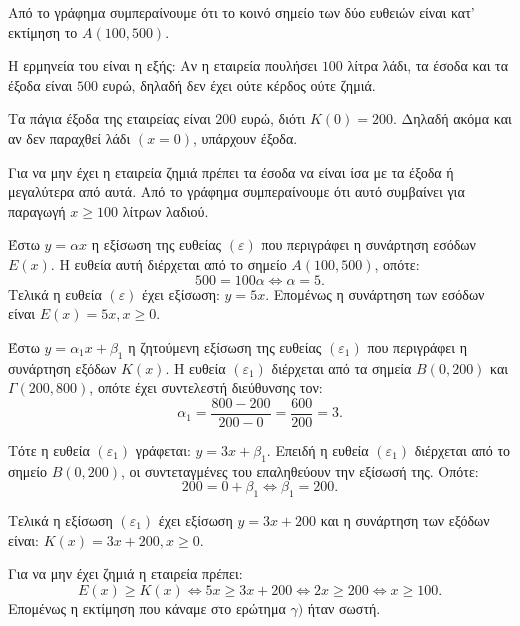 
\begin{alist}
\item Από το γράφημα συμπεραίνουμε ότι το κοινό σημείο των δύο ευθειών είναι κατ' εκτίμηση το $A(100, 500)$.

Η ερμηνεία του είναι η εξής:
Αν η εταιρεία πουλήσει $100$ λίτρα λάδι, τα έσοδα και τα έξοδα είναι $500$ ευρώ, δηλαδή δεν έχει ούτε κέρδος ούτε ζημιά.

\item Τα πάγια έξοδα της εταιρείας είναι $200$ ευρώ, διότι $K(0) = 200$. Δηλαδή ακόμα και αν δεν παραχθεί λάδι $(x = 0)$, υπάρχουν έξοδα.

\item Για να μην έχει η εταιρεία ζημιά πρέπει τα έσοδα να είναι ίσα με τα έξοδα ή μεγαλύτερα από αυτά. Από το γράφημα συμπεραίνουμε ότι αυτό συμβαίνει για παραγωγή $x \ge 100$ λίτρων λαδιού.

\item Έστω $y = \alpha x$ η εξίσωση της ευθείας $(\varepsilon)$ που περιγράφει η συνάρτηση εσόδων $E(x)$. Η ευθεία αυτή διέρχεται από το σημείο $A(100, 500)$, οπότε:
\[500 = 100\alpha \Leftrightarrow \alpha = 5.\]
Τελικά η ευθεία $(\varepsilon)$ έχει εξίσωση: $y = 5x$.
Επομένως η συνάρτηση των εσόδων είναι $E(x) = 5x, x \ge 0$.

Έστω $y = \alpha_1 x + \beta_1$ η ζητούμενη εξίσωση της ευθείας $(\varepsilon_1)$ που περιγράφει η συνάρτηση εξόδων $K(x)$. Η ευθεία $(\varepsilon_1)$ διέρχεται από τα σημεία $B(0, 200)$ και $\Gamma(200, 800)$, οπότε έχει συντελεστή διεύθυνσης τον:
\[\alpha_1 = \dfrac{800 - 200}{200 - 0} = \dfrac{600}{200} = 3.\]

Τότε η ευθεία $(\varepsilon_1)$ γράφεται: $y = 3x + \beta_1$.
Επειδή η ευθεία $(\varepsilon_1)$ διέρχεται από το σημείο $B(0, 200)$, οι συντεταγμένες του επαληθεύουν την εξίσωσή της. Οπότε:
\[200 = 0 + \beta_1 \Leftrightarrow \beta_1 = 200.\]

Τελικά η εξίσωση $(\varepsilon_1)$ έχει εξίσωση $y = 3x + 200$ και η συνάρτηση των εξόδων είναι:
$K(x) = 3x + 200, x \ge 0$.

Για να μην έχει ζημιά η εταιρεία πρέπει:
\[E(x) \ge K(x) \Leftrightarrow 5x \ge 3x + 200 \Leftrightarrow 2x \ge 200 \Leftrightarrow x \ge 100.\]
Επομένως η εκτίμηση που κάναμε στο ερώτημα $\gamma)$ ήταν σωστή.
\end{alist}

